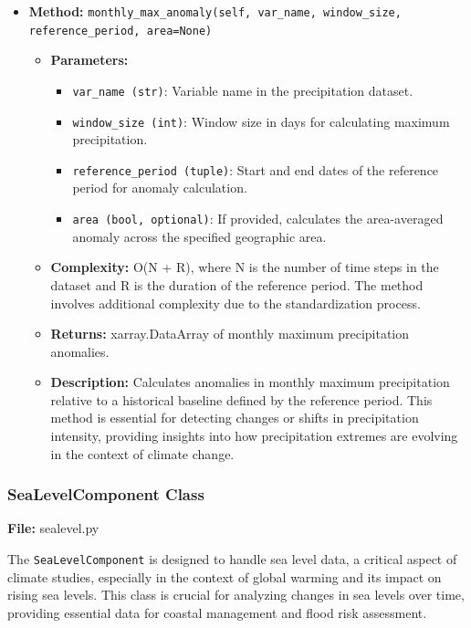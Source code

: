 \documentclass[a4paper,12pt]{article}
\begin{document}
\begin{itemize}
    \item \textbf{Method:} \texttt{monthly\_max\_anomaly(self, var\_name, window\_size, reference\_period, area=None)}
    \begin{itemize}
        \item \textbf{Parameters:}
        \begin{itemize}
            \item \texttt{var\_name (str)}: Variable name in the precipitation dataset.
            \item \texttt{window\_size (int)}: Window size in days for calculating maximum precipitation.
            \item \texttt{reference\_period (tuple)}: Start and end dates of the reference period for anomaly calculation.
            \item \texttt{area (bool, optional)}: If provided, calculates the area-averaged anomaly across the specified geographic area.
        \end{itemize}
        \item \textbf{Complexity:} O(N + R), where N is the number of time steps in the dataset and R is the duration of the reference period. The method involves additional complexity due to the standardization process.
        \item \textbf{Returns:} xarray.DataArray of monthly maximum precipitation anomalies.
        \item \textbf{Description:} Calculates anomalies in monthly maximum precipitation relative to a historical baseline defined by the reference period. This method is essential for detecting changes or shifts in precipitation intensity, providing insights into how precipitation extremes are evolving in the context of climate change.
    \end{itemize}
\end{itemize}


\subsubsection{SeaLevelComponent Class}
\textbf{File:} sealevel.py

The \texttt{SeaLevelComponent} is designed to handle sea level data, a critical aspect of climate studies, especially in the context of global warming and its impact on rising sea levels. This class is crucial for analyzing changes in sea levels over time, providing essential data for coastal management and flood risk assessment.
\end{document}
